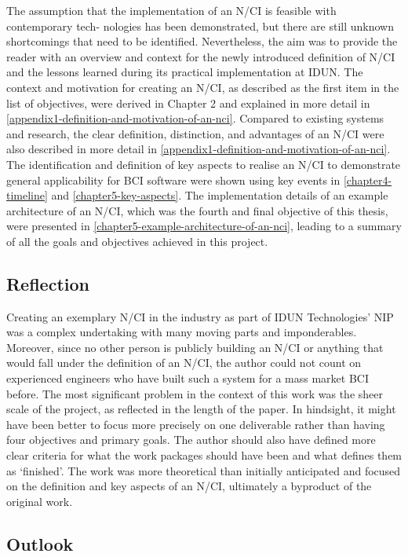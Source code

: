 The assumption that the implementation of an N/CI is feasible with contemporary tech- nologies has been demonstrated, but there are still unknown shortcomings that need to be identified. Nevertheless, the aim was to provide the reader with an overview and context for the newly introduced definition of N/CI and the lessons learned during its practical implementation at IDUN. The context and motivation for creating an N/CI, as described as the first item in the list of objectives, were derived in Chapter 2 and explained in more detail in \autoref{appendix1-definition-and-motivation-of-an-nci}. Compared to existing systems and research, the clear definition, distinction, and advantages of an N/CI were also described in more detail in \autoref{appendix1-definition-and-motivation-of-an-nci}. The identification and definition of key aspects to realise an N/CI to demonstrate general applicability for BCI software were shown using key events in \autoref{chapter4-timeline} and \autoref{chapter5-key-aspects}. The implementation details of an example architecture of an N/CI, which was the fourth and final objective of this thesis, were presented in \autoref{chapter5-example-architecture-of-an-nci}, leading to a summary of all the goals and objectives achieved in this project.

\subsection{Reflection}
\label{chapter5-reflection}

Creating an exemplary N/CI in the industry as part of IDUN Technologies’ NIP was a complex undertaking with many moving parts and imponderables. Moreover, since no other person is publicly building an N/CI or anything that would fall under the definition of an N/CI, the author could not count on experienced engineers who have built such a system for a mass market BCI before. The most significant problem in the context of this work was the sheer scale of the project, as reflected in the length of the paper. In hindsight, it might have been better to focus more precisely on one deliverable rather than having four objectives and primary goals. The author should also have defined more clear criteria for what the work packages should have been and what defines them as ‘finished’. The work was more theoretical than initially anticipated and focused on the definition and key aspects of an N/CI, ultimately a byproduct of the original work.

\subsection{Outlook}
\label{chapter5-outlook}

